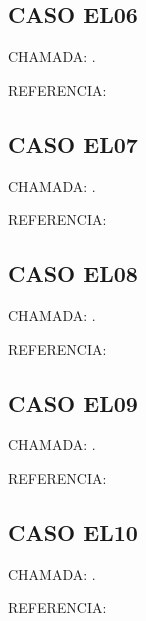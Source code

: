 \documentclass{undftex}
\begin{document}
\begin{refsection}\section*{CASO EL06}\noindent CHAMADA: . \textcite{loc06}\par\noindent REFERENCIA:\par\printbibliography[heading=none,check=undfconsultadas]\end{refsection}\clearpage
\begin{refsection}\section*{CASO EL07}\noindent CHAMADA: . \textcite{loc07}\par\noindent REFERENCIA:\par\printbibliography[heading=none,check=undfconsultadas]\end{refsection}\clearpage
\begin{refsection}\section*{CASO EL08}\noindent CHAMADA: . \textcite{loc08}\par\noindent REFERENCIA:\par\printbibliography[heading=none,check=undfconsultadas]\end{refsection}\clearpage
\begin{refsection}\section*{CASO EL09}\noindent CHAMADA: . \textcite{loc09}\par\noindent REFERENCIA:\par\printbibliography[heading=none,check=undfconsultadas]\end{refsection}\clearpage
\begin{refsection}\section*{CASO EL10}\noindent CHAMADA: . \textcite{loc10}\par\noindent REFERENCIA:\par\printbibliography[heading=none,check=undfconsultadas]\end{refsection}\clearpage
\end{document}
